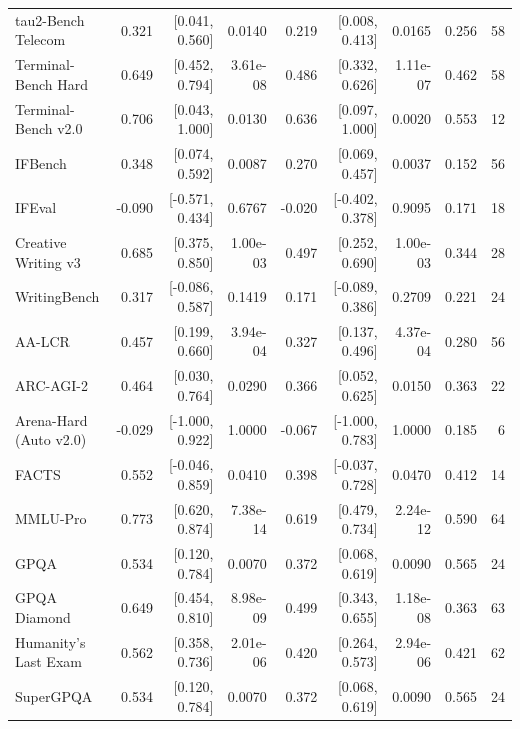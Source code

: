 \begin{longtable}{lrrrrrrrr}
tau2-Bench Telecom & 0.321 & [0.041, 0.560] & 0.0140 & 0.219 & [0.008, 0.413] & 0.0165 & 0.256 & 58 \\
Terminal-Bench Hard & 0.649 & [0.452, 0.794] & 3.61e-08 & 0.486 & [0.332, 0.626] & 1.11e-07 & 0.462 & 58 \\
Terminal-Bench v2.0 & 0.706 & [0.043, 1.000] & 0.0130 & 0.636 & [0.097, 1.000] & 0.0020 & 0.553 & 12 \\
IFBench & 0.348 & [0.074, 0.592] & 0.0087 & 0.270 & [0.069, 0.457] & 0.0037 & 0.152 & 56 \\
IFEval & -0.090 & [-0.571, 0.434] & 0.6767 & -0.020 & [-0.402, 0.378] & 0.9095 & 0.171 & 18 \\
Creative Writing v3 & 0.685 & [0.375, 0.850] & 1.00e-03 & 0.497 & [0.252, 0.690] & 1.00e-03 & 0.344 & 28 \\
WritingBench & 0.317 & [-0.086, 0.587] & 0.1419 & 0.171 & [-0.089, 0.386] & 0.2709 & 0.221 & 24 \\
AA-LCR & 0.457 & [0.199, 0.660] & 3.94e-04 & 0.327 & [0.137, 0.496] & 4.37e-04 & 0.280 & 56 \\
ARC-AGI-2 & 0.464 & [0.030, 0.764] & 0.0290 & 0.366 & [0.052, 0.625] & 0.0150 & 0.363 & 22 \\
Arena-Hard (Auto v2.0) & -0.029 & [-1.000, 0.922] & 1.0000 & -0.067 & [-1.000, 0.783] & 1.0000 & 0.185 & 6 \\
FACTS & 0.552 & [-0.046, 0.859] & 0.0410 & 0.398 & [-0.037, 0.728] & 0.0470 & 0.412 & 14 \\
MMLU-Pro & 0.773 & [0.620, 0.874] & 7.38e-14 & 0.619 & [0.479, 0.734] & 2.24e-12 & 0.590 & 64 \\
GPQA & 0.534 & [0.120, 0.784] & 0.0070 & 0.372 & [0.068, 0.619] & 0.0090 & 0.565 & 24 \\
GPQA Diamond & 0.649 & [0.454, 0.810] & 8.98e-09 & 0.499 & [0.343, 0.655] & 1.18e-08 & 0.363 & 63 \\
Humanity's Last Exam & 0.562 & [0.358, 0.736] & 2.01e-06 & 0.420 & [0.264, 0.573] & 2.94e-06 & 0.421 & 62 \\
SuperGPQA & 0.534 & [0.120, 0.784] & 0.0070 & 0.372 & [0.068, 0.619] & 0.0090 & 0.565 & 24 \\
\end{longtable}
